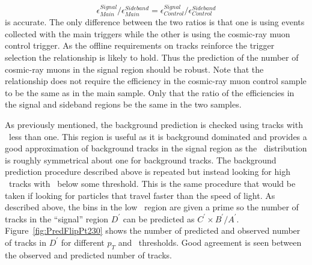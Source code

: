 \begin{equation}
\epsilon_{Main}^{Signal}/ \epsilon_{Main}^{Sideband} = \epsilon_{Control}^{Signal} / \epsilon_{Control}^{Sideband}
\label{eq:ReducedCosmicPredRatio}
\end{equation}
is accurate. The only difference between the two ratios is that one is using events collected with the main triggers while the
other is using the cosmic-ray muon control trigger. As the offline requirements on tracks reinforce the trigger selection the relationship is likely to hold.
Thus the prediction of the number of cosmic-ray muons in the signal region should be robust. Note that the relationship does not require the efficiency
in the cosmic-ray muon control sample to be the same as in the main sample. Only that the ratio of the efficiencies in the signal and sideband regions
be the same in the two samples.

As previously mentioned, the background prediction is checked using tracks with \invbeta\ less than one. This region is useful as it is background dominated
and provides a good approximation of background tracks in the signal region as the \invbeta\ distribution is roughly symmetrical about one for background tracks.
The background prediction procedure described above is repeated but instead looking for high \pt\ tracks with \invbeta\ below some threshold.
This is the same procedure that would be taken if looking for particles that travel faster than the speed of light.
As described above, the bins in the low \invbeta\ region are given a prime so the number of tracks in the ``signal'' region $D^{\prime}$ can be predicted as
$C^{\prime} \times B^{\prime}/A^{\prime}$. Figure~\ref{fig:PredFlipPt230} shows the number of predicted and observed number of tracks in $D^{\prime}$ for different $p_T$
and \invbeta\ thresholds. Good agreement is seen between the observed and predicted number of tracks. 

